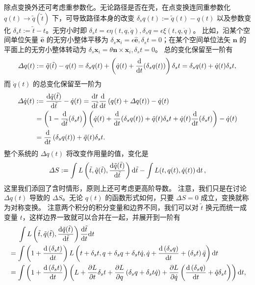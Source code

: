 除点变换外还可考虑重参数化。无论路径是否在壳，在点变换连同重参数化 $q(t)\to\tilde q(\tilde t)$ 下，可导致路径本身的改变 $\delta_s q(t):=\tilde q(t)-q(t)$ 以及参数变化 $\delta_s t:=\tilde t-t$。无穷小时即 $\delta_s t  =\epsilon \eta(t, q, \dot{q}), 
\delta_s q =\epsilon \xi(t, q, \dot{q})$。
比如，沿某个空间单位矢量 $\hat{\bm e}$ 的无穷小整体平移为 $\delta_s \bm x_i=\epsilon\hat{\bm e},\delta_s t=0$；在某个空间单位法矢 $\bm n$ 的平面上的无穷小整体转动为 $\delta_s \bm x_i=\theta\bm n\times\bm x_i,\delta_s t=0$。
总的变化保留至一阶有
\[\Delta q(t):=\tilde q(\tilde t)- q(t)=\delta_s q(t)+\left(\dot{q}(t)+\dv{t}(\delta_s  q(t))\right) \delta_s t=\delta_s q(t)+\dot{q}(t) \delta_s t,\]
而 $\dot q(t)$ 的总变化保留至一阶为
\begin{align*}
    \Delta\dot q(t)&:=\dv{\tilde q(\tilde t)}{\tilde t}-\dot q(t)=\dv{t}{\tilde t}\dv{t}\left(q(t)+\Delta q(t)\right)-\dot q(t)\\
    &=\left(1-\dv{\tilde t}(\delta_s t)\right)\left(\dot q(t)+\dv{t}(\delta_s  q(t))+\ddot{q}(t) \delta_s t+\dot q(t)\dv{t}(\delta_s t)\right)-\dot q(t)\\
    &=\dv{t}\left(\delta_{s} q(t)\right)+ \ddot{q}(t)\delta_{s} t.
\end{align*}
整个系统的 $\Delta q(t)$ 将改变作用量的值，变化是
\[\Delta S:=\int L\left(\tilde t,\tilde q(\tilde t),\dv{\tilde q(\tilde t)}{\tilde t}\right)\dd{\tilde t}-\int L(t,q(t),\dot{q}(t)) \dd{t},\]
这里我们添回了含时情形，原则上还可考虑更高阶导数。
注意，我们只是在讨论 $\Delta q(t)$ 导致的 $\Delta S$。无论 $q(t)$ 的函数形式如何，只要 $\Delta S=0$ 成立，变换就称为对称变换。
注意两个积分的积分变量和边界不同，我们可以对 $\tilde t$ 换元而统一成变量 $t$，这样边界一致就可以合并在一起，并展开到一阶有
\begin{align*} &\quad~\int  L\left(\tilde{t}, \tilde{q}(\tilde{t}), \frac{\mathrm{d} \tilde{q}(\tilde{t})}{\mathrm{d} \tilde{t}}\right) \frac{\mathrm{d} \tilde{t}}{\mathrm{d} t} \dd t\\ & =\int \left(1+\frac{\mathrm{d}\left(\delta_s t\right)}{\mathrm{d} t}\right) L\left(t+\delta_s t, q+\delta_s q+\delta_s t \dot{q}, \dot{q}+\frac{\mathrm{d}\left(\delta_s q\right)}{\mathrm{d} t}+\left(\delta_s t\right) \ddot{q}\right) \dd t  \\ & =\int \left(1+\frac{\mathrm{d}\left(\delta_s t\right)}{\mathrm{d} t}\right)\left(L+\frac{\partial L}{\partial t} \delta_s t+\frac{\partial L}{\partial q}\left(\delta_s q+\delta_s t \dot{q}\right)+\frac{\partial L}{\partial \dot{q}}\left(\frac{\mathrm{d}\left(\delta_s q\right)}{\mathrm{d} t}+\ddot{q}\delta_s t  \right)\right)\dd t,
\end{align*}
